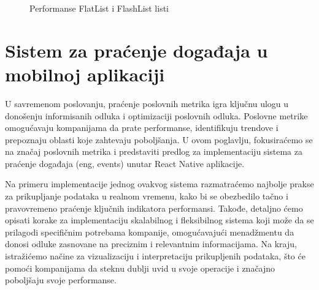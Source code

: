 \documentclass[12pt,oneside]{memoir}
\begin{document}
\begin{figure}[!h]
    \centering
    \qquad
    \caption{Performanse FlatList i FlashList listi}
    \label{fig:flashVSFlat}
\end{figure}

\chapter{Sistem za praćenje događaja u mobilnoj aplikaciji}

U savremenom poslovanju, praćenje poslovnih metrika igra ključnu ulogu u donošenju informisanih odluka i optimizaciji poslovnih odluka. Poslovne metrike omogućavaju kompanijama da prate performanse, identifikuju trendove i prepoznaju oblasti koje zahtevaju poboljšanja. U ovom poglavlju, fokusiraćemo se na značaj poslovnih metrika i predstaviti predlog za implementaciju sistema za praćenje događaja (eng, events) unutar React Native aplikacije.

Na primeru implementacije jednog ovakvog sistema razmatraćemo najbolje prakse za prikupljanje podataka u realnom vremenu, kako bi se obezbedilo tačno i pravovremeno praćenje ključnih indikatora performansi. Takođe, detaljno ćemo opisati korake za implementaciju skalabilnog i fleksibilnog sistema koji može da se prilagodi specifičnim potrebama kompanije, omogućavajući menadžmentu da donosi odluke zasnovane na preciznim i relevantnim informacijama. Na kraju, istražićemo načine za vizualizaciju i interpretaciju prikupljenih podataka, što će pomoći kompanijama da steknu dublji uvid u svoje operacije i značajno poboljšaju svoje performanse.
\end{document}
